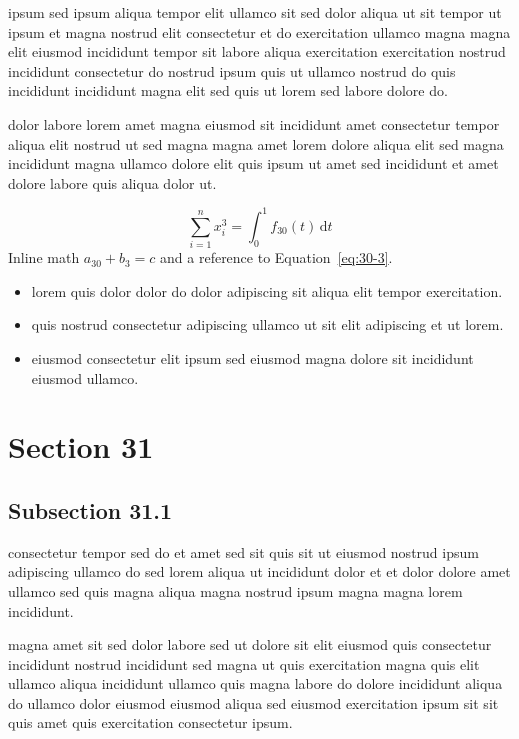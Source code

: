 \documentclass{article}
\begin{document}
ipsum sed ipsum aliqua tempor elit ullamco sit sed dolor aliqua ut sit tempor ut ipsum et magna nostrud elit consectetur et do exercitation ullamco magna magna elit eiusmod incididunt tempor sit labore aliqua exercitation exercitation nostrud incididunt consectetur do nostrud ipsum quis ut ullamco nostrud do quis incididunt incididunt magna elit sed quis ut lorem sed labore dolore do.

dolor labore lorem amet magna eiusmod sit incididunt amet consectetur tempor aliqua elit nostrud ut sed magna magna amet lorem dolore aliqua elit sed magna incididunt magna ullamco dolore elit quis ipsum ut amet sed incididunt et amet dolore labore quis aliqua dolor ut.

\begin{equation}\label{eq:30-3}
  \sum_{i=1}^{n} x_i^{3} = \int_0^1 f_{30}(t)\,\mathrm{d}t
\end{equation}
Inline math $a_{30} + b_{3} = c$ and a reference to Equation~\eqref{eq:30-3}.

\begin{itemize}
  \item lorem quis dolor dolor do dolor adipiscing sit aliqua elit tempor exercitation.
  \item quis nostrud consectetur adipiscing ullamco ut sit elit adipiscing et ut lorem.
  \item eiusmod consectetur elit ipsum sed eiusmod magna dolore sit incididunt eiusmod ullamco.
\end{itemize}

\section{Section 31}\label{sec:31}
\subsection{Subsection 31.1}\label{sec:31-1}
consectetur tempor sed do et amet sed sit quis sit ut eiusmod nostrud ipsum adipiscing ullamco do sed lorem aliqua ut incididunt dolor et et dolor dolore amet ullamco sed quis magna aliqua magna nostrud ipsum magna magna lorem incididunt.

magna amet sit sed dolor labore sed ut dolore sit elit eiusmod quis consectetur incididunt nostrud incididunt sed magna ut quis exercitation magna quis elit ullamco aliqua incididunt ullamco quis magna labore do dolore incididunt aliqua do ullamco dolor eiusmod eiusmod aliqua sed eiusmod exercitation ipsum sit sit quis amet quis exercitation consectetur ipsum.
\end{document}
